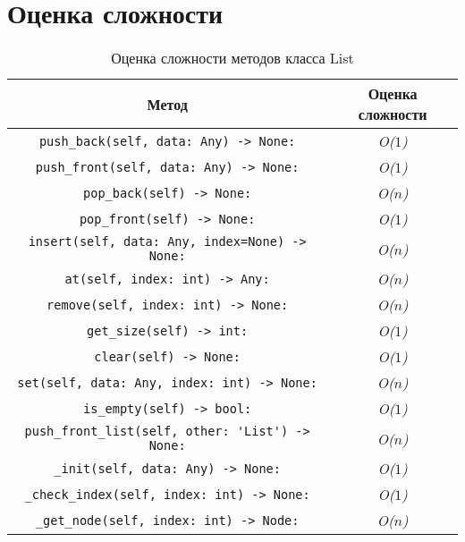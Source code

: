 \section*{Оценка сложности}

\begin{table}[H]
    \centering
    \caption{Оценка сложности методов класса List}
    \begin{tabular}{|c|c|}
        \hline
        Метод & Оценка сложности \\ 
        \hline
        \verb|push_back(self, data: Any) -> None:| & \textit{O($ 1 $)} \\ 
        \hline
        \verb|push_front(self, data: Any) -> None:| & \textit{O($ 1 $)} \\ 
        \hline
        \verb|pop_back(self) -> None:| & \textit{O($ n $)} \\ 
        \hline
        \verb|pop_front(self) -> None:| & \textit{O($ 1 $)} \\ 
        \hline
        \verb|insert(self, data: Any, index=None) -> None:| & \textit{O($ n $)} \\ 
        \hline
        \verb|at(self, index: int) -> Any:| & \textit{O($ n $)} \\ 
        \hline
        \verb|remove(self, index: int) -> None:| & \textit{O($ n $)} \\ 
        \hline
        \verb|get_size(self) -> int:| & \textit{O($ 1 $)} \\ 
        \hline
        \verb|clear(self) -> None:| & \textit{O($ 1 $)} \\ 
        \hline
        \verb|set(self, data: Any, index: int) -> None:| & \textit{O($ n $)} \\ 
        \hline
        \verb|is_empty(self) -> bool:| & \textit{O($ 1 $)} \\ 
        \hline
        \verb|push_front_list(self, other: 'List') -> None:| & \textit{O($ n $)} \\ 
        \hline
        \verb|_init(self, data: Any) -> None:| & \textit{O($ 1 $)} \\ 
        \hline
        \verb|_check_index(self, index: int) -> None:| & \textit{O($ 1 $)} \\ 
        \hline
        \verb|_get_node(self, index: int) -> Node:| & \textit{O($ n $)} \\ 
        \hline
    \end{tabular}
\end{table}



